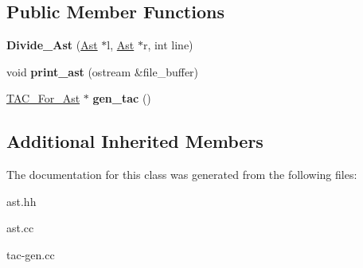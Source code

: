 \subsection*{Public Member Functions}
\begin{DoxyCompactItemize}
\item 
\mbox{\label{classDivide__Ast_a4ee6fe5bbb61edccf3e8e2e3fc2d6d5f}} 
{\bfseries Divide\+\_\+\+Ast} (\hyperlink{classAst}{Ast} $\ast$l, \hyperlink{classAst}{Ast} $\ast$r, int line)
\item 
\mbox{\label{classDivide__Ast_abe370e59efdbbbd7b8afb2d99fbbe49b}} 
void {\bfseries print\+\_\+ast} (ostream \&file\+\_\+buffer)
\item 
\mbox{\label{classDivide__Ast_a69f4bf0a7110a0ebe85292cfcf4f6734}} 
\hyperlink{classTAC__For__Ast}{T\+A\+C\+\_\+\+For\+\_\+\+Ast} $\ast$ {\bfseries gen\+\_\+tac} ()
\end{DoxyCompactItemize}
\subsection*{Additional Inherited Members}


The documentation for this class was generated from the following files\+:\begin{DoxyCompactItemize}
\item 
ast.\+hh\item 
ast.\+cc\item 
tac-\/gen.\+cc\end{DoxyCompactItemize}
